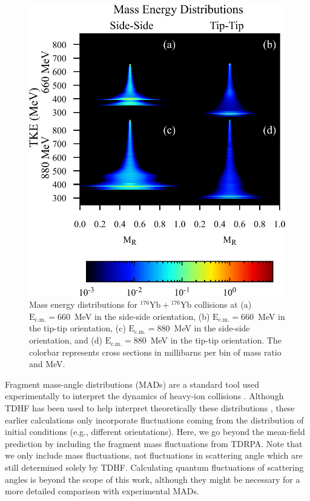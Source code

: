 \begin{figure}
	\includegraphics*[width=\textwidth]{../Figures/YbYb/MED.pdf}
	\caption{Mass energy distributions for $^{176}\mathrm{Yb}+{}^{176}\mathrm{Yb}$ collisions at (a) $\mathrm{E_{c.m.}}=660$~MeV in the side-side orientation, (b) $\mathrm{E_{c.m.}}=660$~MeV in the tip-tip orientation, (c) $\mathrm{E_{c.m.}}=880$~MeV in the side-side orientation, and (d) $\mathrm{E_{c.m.}}=880$~MeV in the tip-tip orientation. The colorbar represents cross sections in millibarns per bin of mass ratio and MeV.}
	\label{fig:med}
\end{figure}

Fragment mass-angle distributions (MADs) are a standard tool used experimentally to interpret the dynamics of heavy-ion collisions \citep{toke1985,shen1987,hinde2008,simenel2012b,durietz2013,wakhle2014,hammerton2015,morjean2017,mohanto2018,hinde2018}.
Although TDHF has been used to help interpret theoretically these distributions \citep{wakhle2014,hammerton2015,umar2016,sekizawa2016}, 
these earlier calculations only incorporate fluctuations coming from the distribution of initial conditions (e.g., different orientations). 
Here, we go beyond the mean-field prediction by including the fragment mass fluctuations from TDRPA.
Note that we only include mass fluctuations, not fluctuations in scattering angle which are still determined solely by TDHF. 
Calculating quantum fluctuations of scattering angles is beyond the scope of this work, although they might be necessary for a more detailed comparison with experimental MADs.

